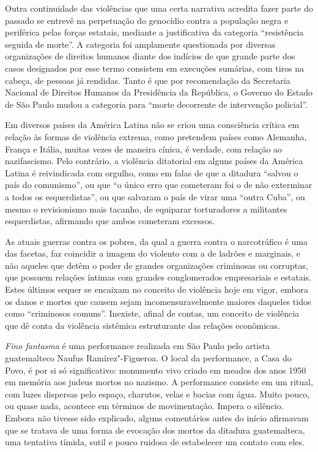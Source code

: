 Outra continuidade das violências que uma certa narrativa acredita fazer
parte do passado se entrevê na perpetuação do genocídio contra a
população negra e periférica pelas forças estatais, mediante a
justificativa da categoria ``resistência seguida de morte''. A categoria
foi amplamente questionada por diversas organizações de direitos humanos
diante dos indícios de que grande parte dos casos designados por esse
termo consistem em execuções sumárias, com tiros na cabeça, de pessoas
já rendidas. Tanto é que por recomendação da Secretaria Nacional de
Direitos Humanos da Presidência da República, o Governo do Estado de São
Paulo mudou a categoria para ``morte decorrente de intervenção
policial''.

Em diversos países da América Latina não se criou uma consciência
crítica em relação às formas de violência extrema, como pretendem países
como Alemanha, França e Itália, muitas vezes de maneira cínica, é
verdade, com relação ao nazifascismo. Pelo contrário, a violência
ditatorial em alguns países da América Latina é reivindicada com
orgulho, como em falas de que a ditadura ``salvou o país do comunismo'',
ou que ``o único erro que cometeram foi o de não exterminar a todos os
esquerdistas'', ou que salvaram o país de virar uma ``outra Cuba'', ou
mesmo o revisionismo mais tacanho, de equiparar torturadores a
militantes esquerdistas, afirmando que ambos cometeram excessos.

As atuais guerras contra os pobres, da qual a guerra contra o
narcotráfico é uma das facetas, faz coincidir a imagem do violento com a
de ladrões e marginais, e não aqueles que detêm o poder de grandes
organizações criminosas ou corruptas, que possuem relações íntimas com
grandes conglomerados empresariais e estatais. Estes últimos sequer se
encaixam no conceito de violência hoje em vigor, embora os danos e
mortes que causem sejam incomensuravelmente maiores daqueles tidos como
``criminosos comuns''. Inexiste, afinal de contas, um conceito de
violência que dê conta da violência sistêmica estruturante das
relações econômicas.

\asterisc

\emph{Fino fantasma} é uma performance realizada em São Paulo pelo
artista guatemalteco Naufus Ramírez"-Figueroa. O local da performance, a
Casa do Povo, é por si só significativo: monumento vivo criado em meados
dos anos 1950 em memória aos judeus mortos no nazismo. A performance
consiste em um ritual, com luzes dispersas pelo espaço, charutos, velas
e bacias com água. Muito pouco, ou quase nada, acontece em términos de
movimentação. Impera o silêncio. Embora não tivesse sido explicado,
alguns comentários antes do início afirmavam que se tratava de uma forma
de evocação dos mortos da ditadura guatemalteca, uma tentativa tímida,
sutil e pouco ruidosa de estabelecer um contato com eles.

